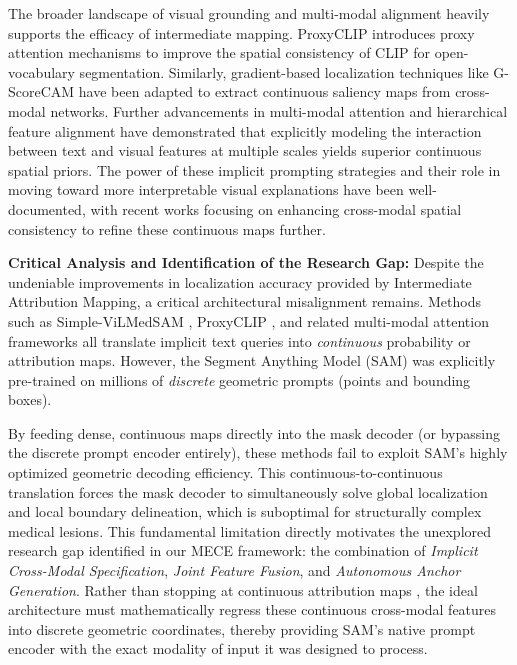 \documentclass[onecolumn]{IEEEtran}
\numberwithin{equation}{section}
\theoremstyle{definition}
\theoremstyle{remark}
\begin{document}
The broader landscape of visual grounding and multi-modal alignment heavily supports the efficacy of intermediate mapping. ProxyCLIP \cite{lan2024proxyclip} introduces proxy attention mechanisms to improve the spatial consistency of CLIP for open-vocabulary segmentation. Similarly, gradient-based localization techniques like G-ScoreCAM \cite{chen2022gscorecam} have been adapted to extract continuous saliency maps from cross-modal networks. Further advancements in multi-modal attention \cite{lin2023multi, chen2024ma} and hierarchical feature alignment \cite{wu2026hierarchical} have demonstrated that explicitly modeling the interaction between text and visual features at multiple scales yields superior continuous spatial priors. The power of these implicit prompting strategies \cite{yuan2023power} and their role in moving toward more interpretable visual explanations \cite{tu2023towards} have been well-documented, with recent works focusing on enhancing cross-modal spatial consistency \cite{konwer2025enhancing} to refine these continuous maps further.

\textbf{Critical Analysis and Identification of the Research Gap:} 
Despite the undeniable improvements in localization accuracy provided by Intermediate Attribution Mapping, a critical architectural misalignment remains. Methods such as Simple-ViLMedSAM \cite{qian2024simplevilmedsam}, ProxyCLIP \cite{lan2024proxyclip}, and related multi-modal attention frameworks \cite{lin2023multi, chen2024ma, wu2026hierarchical, konwer2025enhancing} all translate implicit text queries into \textit{continuous} probability or attribution maps. However, the Segment Anything Model (SAM) was explicitly pre-trained on millions of \textit{discrete} geometric prompts (points and bounding boxes). 

By feeding dense, continuous maps directly into the mask decoder (or bypassing the discrete prompt encoder entirely), these methods fail to exploit SAM's highly optimized geometric decoding efficiency. This continuous-to-continuous translation forces the mask decoder to simultaneously solve global localization and local boundary delineation, which is suboptimal for structurally complex medical lesions. This fundamental limitation directly motivates the unexplored research gap identified in our MECE framework: the combination of \textit{Implicit Cross-Modal Specification}, \textit{Joint Feature Fusion}, and \textit{Autonomous Anchor Generation}. Rather than stopping at continuous attribution maps \cite{wang2023visual, chen2022gscorecam, tu2023towards, yuan2023power}, the ideal architecture must mathematically regress these continuous cross-modal features into discrete geometric coordinates, thereby providing SAM's native prompt encoder with the exact modality of input it was designed to process.
\end{document}
